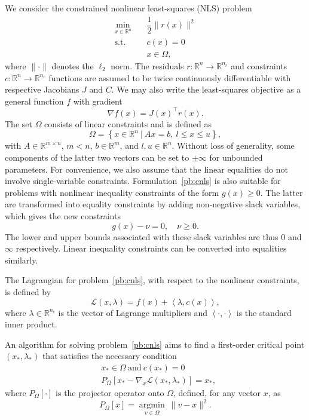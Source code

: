 \documentclass{article}
\numberwithin{equation}{section}
\newcommand{\RR}{{\mathbb{R}}} %
\newcommand{\calL}{{\mathcal{L}}}
\providecommand{\argmin}{\operatorname*{argmin}}
\newcommand{\inner}[2]{\left\langle {#1} , {#2} \right\rangle} %
\newcommand{\proj}[2]{P_{#1} \left[ {#2} \right]} %
\theoremstyle{plain}
\begin{document}
	We consider the constrained nonlinear least-squares (NLS) problem
	\begin{equation}
		\label{pb:cnls}
		\begin{aligned}
			\min_{x\in \RR^n} \quad & \dfrac{1}{2} \|r(x)\|^2 \\
			\text{s.t.} \quad & c(x) = 0 \\
			& x \in \Omega,
		\end{aligned}
	\end{equation}
	where $\|\cdot\|$ denotes the $\ell_2$ norm. The residuals $r\colon \RR^n \to \RR^{n_r}$ and constraints $c\colon \RR^n \to \RR^{n_c}$ functions are assumed to be twice continuously differentiable with respective Jacobians $J$ and $C$. We may also write the least-squares objective as a general function $f$ with gradient 
	\[\nabla f(x) = J(x)^\top r(x).\] 
	The set $\Omega$ consists of linear constraints and is defined as
	\begin{equation}\label{eq:linear_constraints}
		\Omega = \left\{ x \in \RR^n \ | \ Ax=b,\ l \le x \le u\right\},
	\end{equation}
	with $A\in\RR^{m\times n}$, $m < n$, $b\in \RR^m$, and $l,u \in \RR^n$. Without loss of generality, some components of the latter two vectors can be set to $\pm \infty$ for unbounded parameters. For convenience, we also assume that the linear equalities do not involve single-variable constraints. Formulation~\eqref{pb:cnls} is also suitable for problems with nonlinear inequality constraints of the form $g(x) \ge 0$. The latter are transformed into equality constraints by adding non-negative slack variables, which gives the new constraints
	\begin{equation*}
		g(x) - \nu = 0,\quad \nu \ge 0.
	\end{equation*}
	The lower and upper bounds associated with these slack variables are thus $0$ and $\infty$ respectively. Linear inequality constraints can be converted into equalities similarly.
	
	The Lagrangian for problem~\eqref{pb:cnls}, with respect to the nonlinear constraints, is defined by 
	\begin{equation*}
		\calL(x,\lambda) = f(x) + \inner{\lambda}{c(x)},
	\end{equation*}
	where $\lambda \in \RR^{n_c}$ is the vector of Lagrange multipliers and $\inner{\cdot}{\cdot}$ is the standard inner product.
	
	An algorithm for solving problem~\eqref{pb:cnls} aims to find a first-order critical point $(x_*,\lambda_*)$ that satisfies the necessary condition
	\begin{equation*}
		\begin{aligned}
			&x_* \in \Omega\ \text{and}\ c(x_*)=0 \\
			&\proj{\Omega}{x_*-\nabla_x \calL(x_*,\lambda_*)}=x_*,
		\end{aligned}
	\end{equation*}
	where $\proj{\Omega}{\cdot}$ is the projector operator onto $\Omega$, defined, for any vector $x$, as
	\begin{equation*}
		\proj{\Omega}{x}= \argmin_{v\in \Omega} \ \|v-x\|^2. 
	\end{equation*}
	
\end{document}
